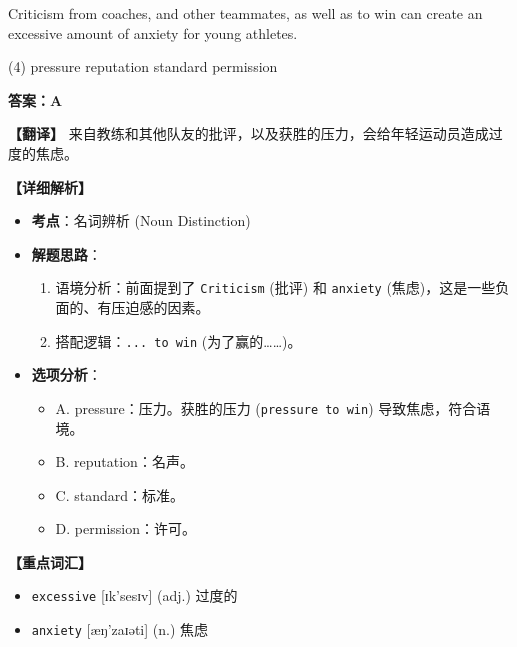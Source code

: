\documentclass[11pt, a4paper]{article}
\newcommand{\analysis}[4]{
    \begin{solutionbox}
        \textbf{答案：#1}
        
        \textbf{【翻译】} #2
        
        \textbf{【详细解析】}
        #3
        
        \textbf{【重点词汇】}
        #4
    \end{solutionbox}
}
\newcommand{\blank}{\underline{\hspace{1.5cm}}}
\begin{document}
\begin{questions}
    \item Criticism from coaches, and other teammates, as well as \blank to win can create an excessive amount of anxiety for young athletes.
    \begin{tasks}(4)
        \task pressure \task reputation \task standard \task permission
    \end{tasks}
    \analysis{A}{来自教练和其他队友的批评，以及获胜的压力，会给年轻运动员造成过度的焦虑。}{
        \begin{itemize}
            \item \textbf{考点}：名词辨析 (Noun Distinction)
            \item \textbf{解题思路}：
                \begin{enumerate}
                    \item 语境分析：前面提到了 \texttt{Criticism} (批评) 和 \texttt{anxiety} (焦虑)，这是一些负面的、有压迫感的因素。
                    \item 搭配逻辑：\texttt{... to win} (为了赢的……)。
                \end{enumerate}
            \item \textbf{选项分析}：
                \begin{itemize}
                    \item A. pressure：压力。获胜的压力 (\texttt{pressure to win}) 导致焦虑，符合语境。
                    \item B. reputation：名声。
                    \item C. standard：标准。
                    \item D. permission：许可。
                \end{itemize}
        \end{itemize}
    }{
        \begin{itemize}
            \item \texttt{excessive} [ɪk'sesɪv] (adj.) 过度的
            \item \texttt{anxiety} [æŋ'zaɪəti] (n.) 焦虑
        \end{itemize}
    }


\end{questions}
\end{document}
